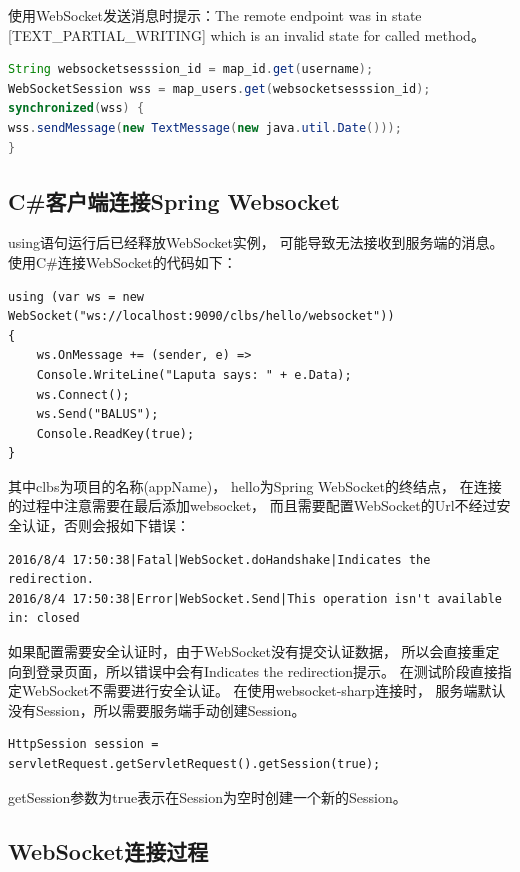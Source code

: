 \documentclass{book}
\begin{document}
使用WebSocket发送消息时提示：The remote endpoint was in 
state [TEXT\_PARTIAL\_WRITING] which is an invalid state for called method。

\begin{lstlisting}[language=Java]
String websocketsesssion_id = map_id.get(username);
WebSocketSession wss = map_users.get(websocketsesssion_id);
synchronized(wss) {
wss.sendMessage(new TextMessage(new java.util.Date()));
}
\end{lstlisting}

\subsection{C\#客户端连接Spring Websocket}

using语句运行后已经释放WebSocket实例，
可能导致无法接收到服务端的消息。
使用C\#连接WebSocket的代码如下：

\begin{lstlisting}[language={[Sharp]C}]
using (var ws = new WebSocket("ws://localhost:9090/clbs/hello/websocket"))
{
	ws.OnMessage += (sender, e) =>
	Console.WriteLine("Laputa says: " + e.Data);
	ws.Connect();
	ws.Send("BALUS");
	Console.ReadKey(true);
}
\end{lstlisting}

其中clbs为项目的名称(appName)，
hello为Spring WebSocket的终结点，
在连接的过程中注意需要在最后添加websocket，
而且需要配置WebSocket的Url不经过安全认证，否则会报如下错误：

\begin{lstlisting}[language={[Sharp]C}]
2016/8/4 17:50:38|Fatal|WebSocket.doHandshake|Indicates the redirection.
2016/8/4 17:50:38|Error|WebSocket.Send|This operation isn't available in: closed
\end{lstlisting}

如果配置需要安全认证时，由于WebSocket没有提交认证数据，
所以会直接重定向到登录页面，所以错误中会有Indicates the redirection提示。
在测试阶段直接指定WebSocket不需要进行安全认证。
在使用websocket-sharp连接时，
服务端默认没有Session，所以需要服务端手动创建Session。

\begin{lstlisting}[language={[Sharp]C}]
HttpSession session = servletRequest.getServletRequest().getSession(true);
\end{lstlisting}

getSession参数为true表示在Session为空时创建一个新的Session。

\subsection{WebSocket连接过程}
\end{document}
